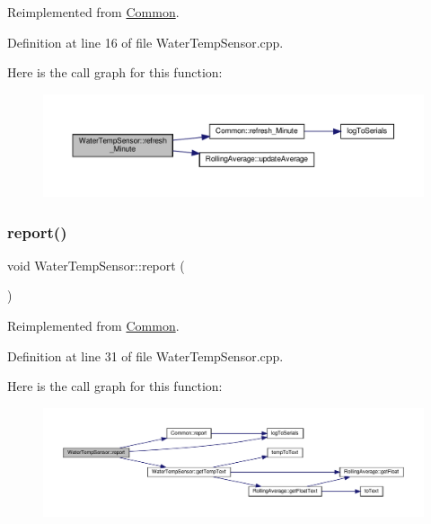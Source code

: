 Reimplemented from \hyperlink{class_common_a14e4462a94bd118028ce1d487ca0292c}{Common}.



Definition at line 16 of file Water\+Temp\+Sensor.\+cpp.

Here is the call graph for this function\+:
\nopagebreak
\begin{figure}[H]
\begin{center}
\leavevmode
\includegraphics[width=350pt]{class_water_temp_sensor_ad3b641c41aea8f28b5b1640e16e2ccde_cgraph}
\end{center}
\end{figure}
\mbox{\label{class_water_temp_sensor_a116d049ce3a6d7150494eb938a6fb6cc}} 
\subsubsection{\texorpdfstring{report()}{report()}\hspace{0.1cm}{\footnotesize\ttfamily [1/2]}}
{\footnotesize\ttfamily void Water\+Temp\+Sensor\+::report (\begin{DoxyParamCaption}{ }\end{DoxyParamCaption})\hspace{0.3cm}{\ttfamily [virtual]}}



Reimplemented from \hyperlink{class_common_a9e60e2c26a5f4d72342a59a969954636}{Common}.



Definition at line 31 of file Water\+Temp\+Sensor.\+cpp.

Here is the call graph for this function\+:
\nopagebreak
\begin{figure}[H]
\begin{center}
\leavevmode
\includegraphics[width=350pt]{class_water_temp_sensor_a116d049ce3a6d7150494eb938a6fb6cc_cgraph}
\end{center}
\end{figure}
\mbox{\label{class_water_temp_sensor_a116d049ce3a6d7150494eb938a6fb6cc}} 
